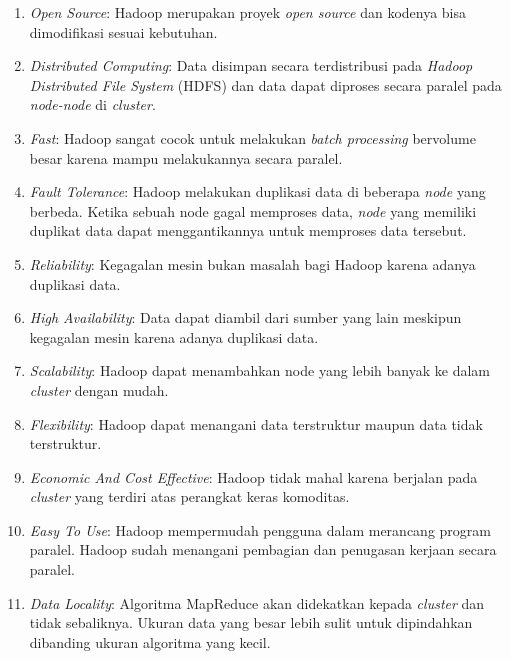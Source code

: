 \begin{enumerate}

\item \textit{Open Source}: Hadoop merupakan proyek \textit{open source} dan kodenya bisa dimodifikasi sesuai kebutuhan. 

\item \textit{Distributed Computing}: Data disimpan secara terdistribusi pada \textit{Hadoop Distributed File System} (HDFS) dan data dapat diproses secara paralel pada \textit{node-node} di \textit{cluster}.

\item \textit{Fast}: Hadoop sangat cocok untuk melakukan \textit{batch processing} bervolume besar karena mampu melakukannya secara paralel.

\item \textit{Fault Tolerance}: Hadoop melakukan duplikasi data di beberapa \textit{node} yang berbeda. Ketika sebuah node gagal memproses data, \textit{node} yang memiliki duplikat data dapat menggantikannya untuk memproses data tersebut.

\item \textit{Reliability}: Kegagalan mesin bukan masalah bagi Hadoop karena adanya duplikasi data.


\item \textit{High Availability}: Data dapat diambil dari sumber yang lain meskipun kegagalan mesin karena adanya duplikasi data.

\item \textit{Scalability}: Hadoop dapat menambahkan node yang lebih banyak ke dalam \textit{cluster} dengan mudah.

\item \textit{Flexibility}: Hadoop dapat menangani data terstruktur maupun data tidak terstruktur. 

\item \textit{Economic And Cost Effective}: Hadoop tidak mahal karena berjalan pada \textit{cluster} yang terdiri atas perangkat keras komoditas.

\item \textit{Easy To Use}: Hadoop mempermudah pengguna dalam merancang program paralel. Hadoop sudah menangani pembagian dan penugasan kerjaan secara paralel.

\item \textit{Data Locality}: Algoritma MapReduce akan didekatkan kepada \textit{cluster} dan tidak sebaliknya. Ukuran data yang besar lebih sulit untuk dipindahkan dibanding ukuran algoritma yang kecil.


\end{enumerate}

